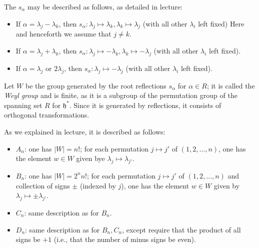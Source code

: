\documentclass[reqno]{amsart} 
\begin{document}
The $s_\alpha$ may be described as follows, as detailed in lecture:
\begin{itemize}
\item If $\alpha = \lambda_j - \lambda_k$, then $s_\alpha : \lambda_j \mapsto \lambda_k, \lambda_k \mapsto \lambda_j$ (with all other $\lambda_i$ left fixed) Here and henceforth we assume that $j \neq k$.
\item If $\alpha = \lambda_j + \lambda_k$, then $s_\alpha : \lambda_j \mapsto - \lambda_k, \lambda_k \mapsto -\lambda_j$ (with all other $\lambda_i$ left fixed).
\item If $\alpha = \lambda_j$ or $2 \lambda_j$, then $s_\alpha : \lambda_j \mapsto -\lambda_j$ (with all other $\lambda_i$ left fixed).
\end{itemize}


\begin{definition}
  \label{defn:weyl-gp-alg}
  Let $W$ be the group generated by the root reflections $s_\alpha$ for $\alpha \in R$; it is called the \emph{Weyl group} and is finite, as it is a subgroup of the permutation group of the spanning set $R$ for $\mathfrak{h}^*$.  Since it is generated by reflections, it consists of orthogonal transformations.
\end{definition}
As we explained in lecture, it is described as follows:
\begin{itemize}
\item $A_n$: one has $|W| = n!$; for each permutation $j \mapsto j'$ of $(1,2,\dotsc,n)$, one has the element $w \in W$ given bye $\lambda_j \mapsto \lambda_{j'}$.
\item $B_n$: one has $|W| = 2^n n!$; for each permutation $j \mapsto j'$ of $(1,2,\dotsc,n)$ and collection of signs $\pm$ (indexed by $j$), one has the element $w \in W$ given by $\lambda_j \mapsto \pm \lambda_{j'}$.
\item $C_n$: same description as for $B_n$.
\item $D_n$: same description as for $B_n,C_n$, except require that the product of all signs be $+1$ (i.e., that the number of minus signs be even).
\end{itemize}
\end{document}
